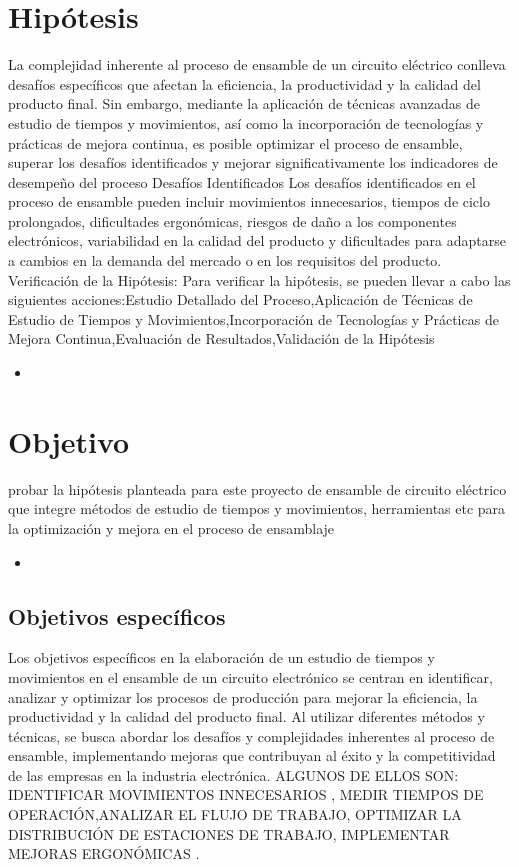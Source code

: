     \section{Hipótesis}
    La complejidad inherente al proceso de ensamble de un circuito eléctrico conlleva desafíos específicos que afectan la eficiencia, la productividad y la calidad del producto final. Sin embargo, mediante la aplicación de técnicas avanzadas de estudio de tiempos y movimientos, así como la incorporación de tecnologías y prácticas de mejora continua, es posible optimizar el proceso de ensamble, superar los desafíos identificados y mejorar significativamente los indicadores de desempeño del proceso
    Desafíos Identificados
    Los desafíos identificados en el proceso de ensamble pueden incluir movimientos innecesarios, tiempos de ciclo prolongados, dificultades ergonómicas, riesgos de daño a los componentes electrónicos, variabilidad en la calidad del producto y dificultades para adaptarse a cambios en la demanda del mercado o en los requisitos del producto.
    Verificación de la Hipótesis:
    Para verificar la hipótesis, se pueden llevar a cabo las siguientes acciones:Estudio Detallado del Proceso,Aplicación de Técnicas de Estudio de Tiempos y Movimientos,Incorporación de Tecnologías y Prácticas de Mejora Continua,Evaluación de Resultados,Validación de la Hipótesis
    
    \begin{itemize}
        \item 
    \end{itemize}
    \section{Objetivo}
    probar la hipótesis planteada para este proyecto de ensamble de circuito eléctrico que integre métodos de estudio de tiempos y movimientos, herramientas etc para la optimización  y mejora en el proceso de ensamblaje 
    
    \begin{itemize}
        \item
    \end{itemize}
    
    \subsection{Objetivos específicos }
    Los objetivos específicos en la elaboración de un estudio de tiempos y movimientos en el ensamble de un circuito electrónico se centran en identificar, analizar y optimizar los procesos de producción para mejorar la eficiencia, la productividad y la calidad del producto final. Al utilizar diferentes métodos y técnicas, se busca abordar los desafíos y complejidades inherentes al proceso de ensamble, implementando mejoras que contribuyan al éxito y la competitividad de las empresas en la industria electrónica.
    ALGUNOS DE ELLOS SON:
    IDENTIFICAR MOVIMIENTOS INNECESARIOS , MEDIR TIEMPOS DE OPERACIÓN,ANALIZAR EL FLUJO DE TRABAJO, OPTIMIZAR LA DISTRIBUCIÓN DE ESTACIONES DE TRABAJO, IMPLEMENTAR MEJORAS ERGONÓMICAS .
    
